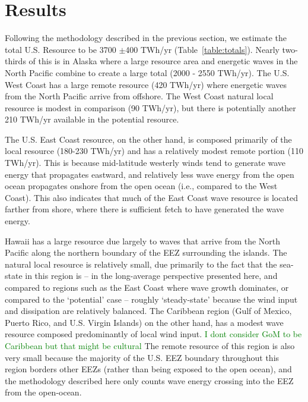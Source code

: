 \section{Results}

Following the methodology described in the previous section, we estimate the total U.S. Resource to be 3700 $\pm$400 TWh/yr (Table~\ref{table:totals}). Nearly two-thirds of this is in Alaska where a large resource area and energetic waves in the North Pacific combine to create a large total (2000 - 2550 TWh/yr). The U.S. West Coast has a large remote resource (420 TWh/yr) where energetic waves from the North Pacific arrive from offshore.  The West Coast natural local resource is modest in comparison (90 TWh/yr), but there is potentially another 210 TWh/yr available in the potential resource.

The U.S. East Coast resource, on the other hand, is composed primarily of the local resource (180-230 TWh/yr) and has a relatively modest remote portion (110 TWh/yr). This is because mid-latitude westerly winds tend to generate wave energy that propagates eastward, and relatively less wave energy from the open ocean propagates onshore from the open ocean (i.e., compared to the West Coast). This also indicates that much of the East Coast wave resource is located farther from shore, where there is sufficient fetch to have generated the wave energy. 

Hawaii has a large resource due largely to waves that arrive from the North Pacific along the northern boundary of the EEZ surrounding the islands. The natural local resource is relatively small, due primarily to the fact that the sea-state in this region is -- in the long-average perspective presented here, and compared to regions such as the East Coast where wave growth dominates, or compared to the `potential' case -- roughly `steady-state' because the wind input and dissipation are relatively balanced. The Caribbean region (Gulf of Mexico, Puerto Rico, and U.S. Virgin Islands) on the other hand, has a modest wave resource composed predominantly of local wind input.  \textcolor{green}{I dont consider GoM to be Caribbean but that might be cultural} The remote resource of this region is also very small because the majority of the U.S. EEZ boundary throughout this region borders other EEZs (rather than being exposed to the open ocean), and the methodology described here only counts wave energy crossing into the EEZ from the open-ocean.

